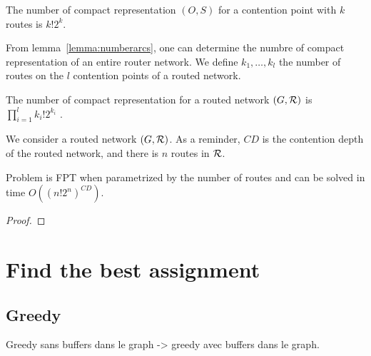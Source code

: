 \documentclass[english]{article}
\begin{document}
\begin{lemma}
 The number of compact representation $(O,S)$ for a contention point with $k$ routes is $k!2^{k}$.
 \label{lemma:numberarcs}
\end{lemma}

From lemma~\ref{lemma:numberarcs}, one can determine the numbre of compact representation of an entire router network.
We define $k_1,\ldots,k_l$ the number of routes on the $l$ contention points of a routed network.
\begin{lemma}
 The number of compact representation for a routed network $(G,{\cal R})$ is $\prod_{i=1}^l k_i!2^{k_i}$ .
 \label{lemma:numbergraph}
\end{lemma}

We consider a routed network $(G,{\cal R})$. As a reminder, $CD$ is the contention depth of the routed network, and  there is $n$ routes in ${\cal R}$.
\begin{theorem}
 Problem \spall is FPT when parametrized by the number of routes and can be solved in time $O( ( n!2^{n})^{CD})$.
\end{theorem}
\begin{proof}
\end{proof}




\section{Find the best assignment}
\subsection{Greedy}
Greedy sans buffers dans le graph -> greedy avec buffers dans le graph.
\end{document}
